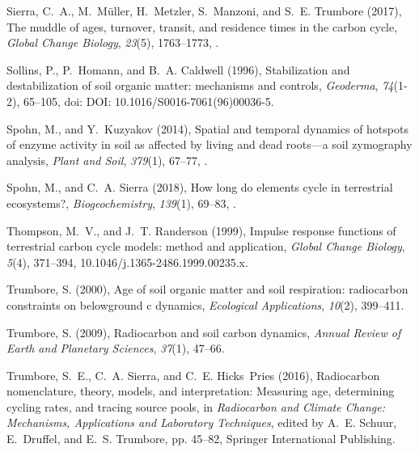 \documentclass[draft,linenumbers]{agujournal}
\begin{document}
\begin{thebibliography}{41}
Sierra, C.~A., M.~M{\"u}ller, H.~Metzler, S.~Manzoni, and S.~E. Trumbore
  (2017), The muddle of ages, turnover, transit, and residence times in the
  carbon cycle, \textit{Global Change Biology}, \textit{23}(5), 1763--1773,
  .

Sollins, P., P.~Homann, and B.~A. Caldwell (1996), Stabilization and
  destabilization of soil organic matter: mechanisms and controls,
  \textit{Geoderma}, \textit{74}(1-2), 65--105, doi: DOI:
  10.1016/S0016-7061(96)00036-5.

Spohn, M., and Y.~Kuzyakov (2014), Spatial and temporal dynamics of hotspots of
  enzyme activity in soil as affected by living and dead roots---a soil
  zymography analysis, \textit{Plant and Soil}, \textit{379}(1), 67--77,
  .

Spohn, M., and C.~A. Sierra (2018), How long do elements cycle in terrestrial
  ecosystems?, \textit{Biogeochemistry}, \textit{139}(1), 69--83,
  .

Thompson, M.~V., and J.~T. Randerson (1999), Impulse response functions of
  terrestrial carbon cycle models: method and application, \textit{Global
  Change Biology}, \textit{5}(4), 371--394, 10.1046/j.1365-2486.1999.00235.x.

Trumbore, S. (2000), Age of soil organic matter and soil respiration:
  radiocarbon constraints on belowground c dynamics, \textit{Ecological
  Applications}, \textit{10}(2), 399--411.

Trumbore, S. (2009), Radiocarbon and soil carbon dynamics, \textit{Annual
  Review of Earth and Planetary Sciences}, \textit{37}(1), 47--66.

Trumbore, S.~E., C.~A. Sierra, and C.~E. Hicks~Pries (2016), Radiocarbon
  nomenclature, theory, models, and interpretation: Measuring age, determining
  cycling rates, and tracing source pools, in \textit{Radiocarbon and Climate
  Change: Mechanisms, Applications and Laboratory Techniques}, edited by A.~E.
  Schuur, E.~Druffel, and E.~S. Trumbore, pp. 45--82, Springer International
  Publishing.


\end{thebibliography}
\end{document}
